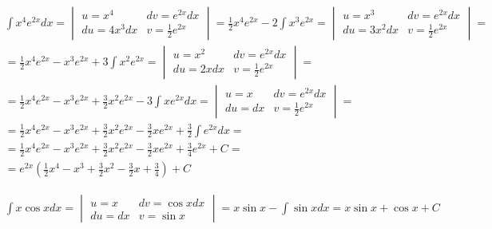 
\begin{gather*}
  \int x^4e^{2x} dx =
  \begin{vmatrix}
    u=x^4 & dv=e^{2x}dx \\
    du=4x^3dx & v=\frac{1}{2}e^{2x}
  \end{vmatrix}
  = \frac{1}{2}x^4e^{2x} - 2\int x^3e^{2x} =
  \begin{vmatrix}
    u=x^3 & dv=e^{2x}dx \\
    du=3x^2dx & v=\frac{1}{2}e^{2x}
  \end{vmatrix} = \\
  = \frac{1}{2}x^4e^{2x} - x^3e^{2x} + 3\int x^2e^{2x} =
  \begin{vmatrix}
    u=x^2 & dv=e^{2x}dx \\
    du=2xdx & v=\frac{1}{2}e^{2x}
  \end{vmatrix} = \\
  = \frac{1}{2}x^4e^{2x} - x^3e^{2x}  + \frac{3}{2}x^2e^{2x} - 3 \int xe^{2x} dx =
  \begin{vmatrix}
    u=x & dv=e^{2x} dx \\
    du=dx & v=\frac{1}{2}e^{2x}
  \end{vmatrix} = \\
  = \frac{1}{2}x^4e^{2x} - x^3e^{2x}  + \frac{3}{2}x^2e^{2x} - \frac{3}{2}xe^{2x} + \frac{3}{2} \int e^{2x} dx = \\
  = \frac{1}{2}x^4e^{2x} - x^3e^{2x}  + \frac{3}{2}x^2e^{2x} - \frac{3}{2}xe^{2x} + \frac{3}{4}e^{2x} + C = \\
  = e^{2x}\left(\frac{1}{2}x^4-x^3+\frac{3}{2}x^2-\frac{3}{2}x+\frac{3}{4}\right)+C
\end{gather*}




\begin{gather*}
  \int x\cos x dx =
  \begin{vmatrix}
    u=x & dv=\cos xdx \\
    du=dx & v=\sin x
  \end{vmatrix}
  = x\sin x - \int \sin x dx
  = x\sin x + \cos x+C
\end{gather*}

